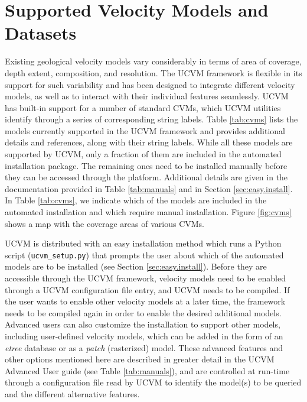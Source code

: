 




\section{Supported Velocity Models and Datasets}
\label{sec:cvms}

Existing geological velocity models vary considerably in terms of area of coverage, depth extent, composition, and resolution. The UCVM framework is flexible in its support for such variability and has been designed to integrate different velocity models, as well as to interact with their individual features seamlessly. UCVM has built-in support for a number of standard CVMs, which UCVM utilities identify through a series of corresponding string labels. Table \ref{tab:cvms} lists the models currently supported in the UCVM framework and provides additional details and references, along with their string labels. While all these models are supported by UCVM, only a fraction of them are included in the automated installation package. The remaining ones need to be installed manually before they can be accessed through the platform. Additional details are given in the documentation provided in Table \ref{tab:manuals} and in Section \ref{sec:easy.install}. In Table \ref{tab:cvms}, we indicate which of the models are included in the automated installation and which require manual installation. Figure \ref{fig:cvms} shows a map with the coverage areas of various CVMs.

UCVM is distributed with an easy installation method which runs a Python script (\texttt{ucvm\_set\-up.py}) that prompts the user about which of the automated models are to be installed (see Section \ref{sec:easy.install}). Before they are accessible through the UCVM framework, velocity models need to be enabled through a UCVM configuration file entry, and UCVM needs to be compiled. If the user wants to enable other velocity models at a later time, the framework needs to be compiled again in order to enable the desired additional models. Advanced users can also customize the installation to support other models, including user-defined velocity models, which can be added in the form of an \textit{etree} \citep{Tu_2003_Tech} database or as a \textit{patch} (rasterized) model. These advanced features and other options mentioned here are described in greater detail in the UCVM Advanced User guide (see Table \ref{tab:manuals}), and are controlled at run-time through a configuration file read by UCVM to identify the model(s) to be queried and the different alternative features.

